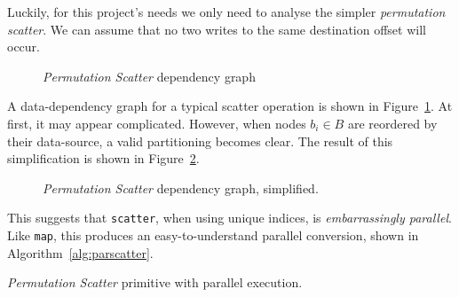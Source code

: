 Luckily, for this project's needs we only need to analyse the simpler \emph{permutation scatter}. We can assume that no two writes to the same destination offset will occur.

\begin{figure}[h]
  \caption{\emph{Permutation Scatter} dependency graph}
  \label{fig:scatgraph1}
  \begin{center}
  \end{center}
\end{figure}
A data-dependency graph for a typical scatter operation is shown in Figure~\ref{fig:scatgraph1}.
At first, it may appear complicated. However, when nodes $b_i \in B$ are reordered by their data-source, a valid partitioning becomes clear. The result of this simplification is shown in Figure~\ref{fig:scatgraph2}.

\begin{figure}[h]
  \caption{\emph{Permutation Scatter} dependency graph, simplified.}
  \label{fig:scatgraph2}
  \begin{center}
  \end{center}
\end{figure}

This suggests that \verb|scatter|, when using unique indices, is \emph{embarrassingly parallel}. Like \verb|map|, this produces an easy-to-understand parallel conversion, shown in Algorithm~\ref{alg:parscatter}.

\begin{algorithm}
  \caption{\emph{Permutation Scatter} primitive with parallel execution.}
  \label{alg:parscatter}

  \begin{algorithmic}
      \EndPFor
    \EndFunction
  \end{algorithmic}
\end{algorithm}

